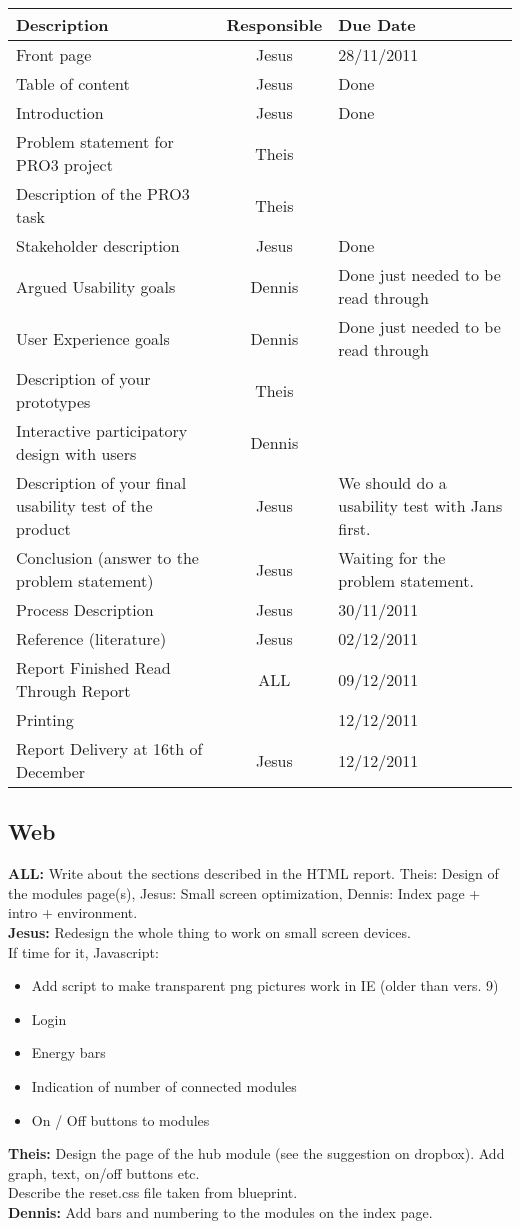 \documentclass[10pt,a4paper]{article}
\begin{document}
\begin{tabular}{ | p{8cm} | c | p{5cm} |}
\hline
Description & Responsible & Due Date \\ \hline
Front page & Jesus & 28/11/2011\\ \hline
Table of content & Jesus & Done \\ \hline
Introduction & Jesus & Done\\ \hline
Problem statement for PRO3 project & Theis & \\ \hline
Description of the PRO3 task & Theis & \\ \hline
Stakeholder description & Jesus  & Done\\ \hline
Argued Usability goals & Dennis & Done just needed to be read through\\ \hline
User Experience goals &  Dennis  & Done just needed to be read through\\ \hline
Description of your prototypes & Theis & \\ \hline
Interactive participatory design with users & Dennis  & \\ \hline
Description of your final usability test of the product & Jesus & We should do a usability test with Jans first. \\ \hline
Conclusion (answer to the problem statement) & Jesus  & Waiting for the problem statement.\\ \hline
Process Description & Jesus & 30/11/2011\\ \hline
Reference (literature) & Jesus  &  02/12/2011\\ \hline
Report Finished Read Through Report & ALL & 09/12/2011\\ \hline
Printing &  & 12/12/2011\\ \hline
Report Delivery at 16th of December & Jesus & 12/12/2011 \\ \hline
\hline
\end{tabular}

\subsection{Web}
\textbf{ALL:} Write about the sections described in the HTML report. Theis: Design of the modules page(s), Jesus: Small screen optimization, Dennis: Index page + intro + environment.
\\ \textbf{Jesus:} Redesign the whole thing to work on small screen devices.
\\If time for it, Javascript: 
\begin{itemize}
	\item Add script to make transparent png pictures work in IE (older than vers. 9)
	\item Login
	\item Energy bars
	\item Indication of number of connected modules
	\item On / Off buttons to modules
\end{itemize}
\textbf{Theis:}
Design the page of the hub module (see the suggestion on dropbox). Add graph, text, on/off buttons etc.
\\Describe the reset.css file taken from blueprint.
\\\textbf{Dennis:}
Add bars and numbering to the modules on the index page.
\end{document}
